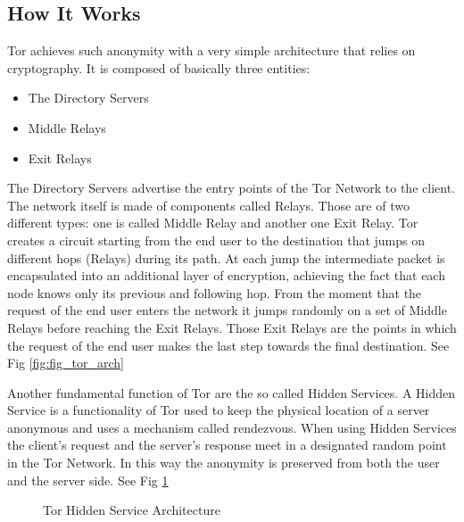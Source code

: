 \documentclass[runningheads,a4paper]{llncs}
\begin{document}
\subsection{How It Works}
Tor achieves such anonymity with a very simple architecture that relies on cryptography.
It is composed of basically three entities: 
\begin{itemize}
    \setlength\itemsep{0.7em}
    \item The Directory Servers
    \item Middle Relays
    \item Exit Relays
\end{itemize}
The Directory Servers advertise the entry points of the Tor Network to the client.
The network itself is made of components called Relays. Those are of two different types: one is called Middle Relay and another one Exit Relay.
Tor creates a circuit starting from the end user to the destination that jumps on 
different hops (Relays) during its path. At each jump the intermediate packet is encapsulated into an additional layer of encryption, achieving the fact that each node knows only its previous and following hop. From the moment that the request of the end user 
enters the network it jumps randomly on a set of Middle Relays before reaching the Exit Relays. 
Those Exit Relays are the points in which the request of the end user makes the last step towards 
the final destination. See Fig \ref{fig:fig_tor_arch}



Another fundamental function of Tor are the so called Hidden Services. A Hidden Service is a functionality of Tor used to keep the physical location of a server anonymous and uses a mechanism called rendezvous. When using Hidden Services the client's request and the server's response meet in a designated random point in the Tor Network. In this way the anonymity is preserved from both the user and the server side. See Fig \ref{fig:fig_tor_hid}
\begin{figure}[]
        \caption{ Tor Hidden Service Architecture}
        \label{fig:fig_tor_hid}
\end{figure}
\end{document}
